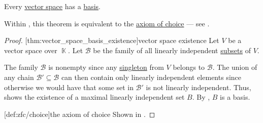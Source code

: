 \begin{theorem}\label{thm:vector_space_basis_existence}
  Every \hyperref[def:vector_space]{vector space} has a \hyperref[def:hamel_basis]{basis}.

  Within \hyperref[def:zfc]{}, this theorem is equivalent to the \hyperref[def:zfc/choice]{axiom of choice} --- see .
\end{theorem}
\begin{proof}
  [thm:vector_space_basis_existence]{vector space existence} Let \( V \) be a vector space over \( \BbbK \). Let \( \mathcal{B} \) be the family of all linearly independent \hyperref[rem:linear_combinations]{subsets} of \( V \).

  The family \( \mathcal{B} \) is nonempty since any \hyperref[rem:singleton_sets]{singleton} from \( V \) belongs to \( \mathcal{B} \). The union of any chain \( \mathcal{B}' \subseteq \mathcal{B} \) can then contain only linearly independent elements since otherwise we would have that some set in \( \mathcal{B}' \) is not linearly independent. Thus,  shows the existence of a maximal linearly independent set \( B \). By , \( B \) is a basis.

  [def:zfc/choice]{the axiom of choice} Shown in \cite{Blass1984}.
\end{proof}

